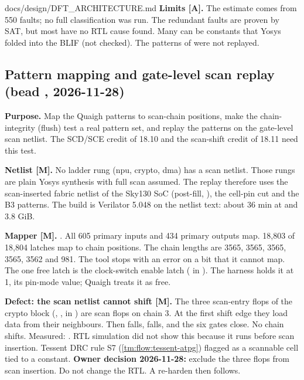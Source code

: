 \begin{relocated}{docs/design/DFT_ARCHITECTURE.md}
\textbf{Limits {[}A{]}.} The estimate comes from 550 faults; no full
classification was run. The redundant faults are proven by SAT, but
most have no RTL cause found. Many can be constants that Yosys folded
into the BLIF (not checked). The patterns of  were not
replayed.

\subsection{Pattern mapping and gate-level scan replay (bead
, 2026-11-28)}\label{tm:ch:dft-architecture:1812-scan-replay}

\textbf{Purpose.} Map the Quaigh patterns to scan-chain positions, make
the chain-integrity (flush) test a real pattern set, and replay the
patterns on the gate-level scan netlist. The SCD/SCE credit of 18.10 and
the scan-shift credit of 18.11 need this test.

\textbf{Netlist {[}M{]}.} No ladder rung (npu, crypto, dma) has a scan
netlist. Those rungs are plain Yosys synthesis with full scan assumed.
The replay therefore uses the scan-inserted fabric netlist of the Sky130
SoC (post-fill, ), the cell-pin cut
 and the B3 patterns. The build is Verilator 5.048 on the
netlist text: about 36 min at  and 3.8 GiB.

\textbf{Mapper {[}M{]}.} . All 605
primary inputs and 434 primary outputs map. 18,803 of 18,804 latches map
to chain positions. The chain lengths are 3565, 3565, 3565, 3565, 3562
and 981. The tool stops with an error on a bit that it cannot map. The
one free latch is the clock-switch enable latch ( in
). The harness holds it at 1, its pin-mode value;
Quaigh treats it as free.

\textbf{Defect: the scan netlist cannot shift {[}M{]}.} The three
scan-entry flops of the crypto block (,
,  in
) are scan flops on chain 3. At the
first shift edge they load data from their neighbours. Then
 falls,  falls, and the six
 gates close. No chain shifts. Measured:
. RTL simulation did not
show this because it runs before scan insertion. Tessent DRC rule S7
(\cref{tm:flow:tessent-atpg}) flagged  as a
scannable cell tied to a constant. \textbf{Owner decision 2026-11-28:}
exclude the three flops from scan insertion. Do not change the RTL. A
re-harden then follows.


\end{relocated}

